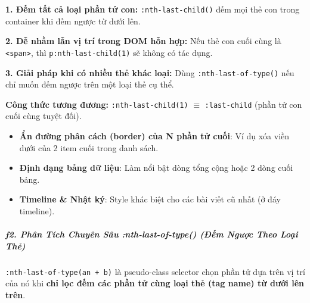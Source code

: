 \documentclass[11pt,oneside]{book}
\newcommand{\codeinline}[1]{\textcolor{accentOrange}{\texttt{#1}}}
\begin{document}
\begin{warnBox}
\textbf{1. Đếm tất cả loại phần tử con:} \codeinline{:nth-last-child()} đếm mọi thẻ con trong container khi đếm ngược từ dưới lên.
\par\vspace{4pt}
\textbf{2. Dễ nhầm lẫn vị trí trong DOM hỗn hợp:} Nếu thẻ con cuối cùng là \codeinline{<span>}, thì \codeinline{p:nth-last-child(1)} sẽ không có tác dụng.
\par\vspace{4pt}
\textbf{3. Giải pháp khi có nhiều thẻ khác loại:} Dùng \codeinline{:nth-last-of-type()} nếu chỉ muốn đếm ngược trên một loại thẻ cụ thể.
\end{warnBox}

\begin{tipBox}
\textbf{Công thức tương đương:} \codeinline{:nth-last-child(1)} $\equiv$ \codeinline{:last-child} (phần tử con cuối cùng tuyệt đối).
\end{tipBox}

\begin{conceptBox}
\begin{itemize}[leftmargin=1.5em, itemsep=3pt, parsep=0pt]
    \item \textbf{Ẩn đường phân cách (border) của N phần tử cuối}: Ví dụ xóa viền dưới của 2 item cuối trong danh sách.
    \item \textbf{Định dạng bảng dữ liệu}: Làm nổi bật dòng tổng cộng hoặc 2 dòng cuối bảng.
    \item \textbf{Timeline \& Nhật ký}: Style khác biệt cho các bài viết cũ nhất (ở đáy timeline).
\end{itemize}
\end{conceptBox}


\subparagraph{f2. Phân Tích Chuyên Sâu :nth-last-of-type() (Đếm Ngược Theo Loại Thẻ)}

\codeinline{:nth-last-of-type(an + b)} là pseudo-class selector chọn phần tử dựa trên vị trí của nó khi \textbf{chỉ lọc đếm các phần tử cùng loại thẻ (tag name) từ dưới lên trên}.
\end{document}
